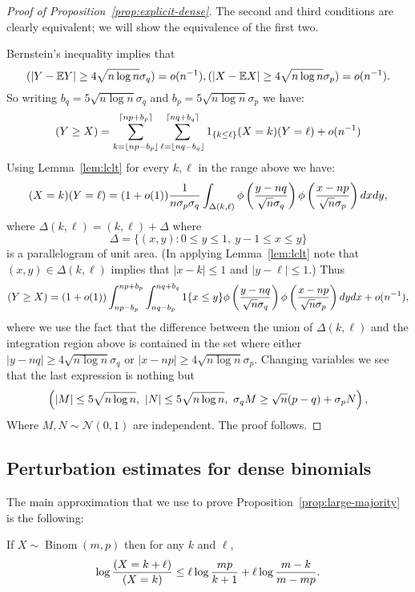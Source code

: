 \documentclass[EJP]{ejpecp}
\newcommand{\E}{\mathbb{E}}
\newcommand{\1}[1]{\mathbbm{1}_{\{#1\}}}
\newcommand{\normal}{\mathcal{N}}
\let\Pr\relax
\DeclareMathOperator{\Pr}{Pr}
\DeclareMathOperator{\Binom}{Binom}
\begin{document}
\begin{proof}[Proof of Proposition~\ref{prop:explicit-dense}]
The second and third conditions are clearly equivalent; we will show
the equivalence of the first two.

Bernstein's inequality implies that
\[
\Pr(|Y-\E Y| \geq 4 \sqrt{n \log n} \sigma_q) = o(n^{-1}),
\Pr(|X-\E X| \geq 4 \sqrt{n \log n} \sigma_p) = o(n^{-1}).
\]
So writing $b_q = 5 \sqrt{n \log n} \sigma_q$ and $b_p = 5 \sqrt{n \log n} \sigma_p$ we have:
\[
\Pr(Y \geq X) =
\sum_{k = \lfloor np - b_p \rfloor}^{\lceil np + b_p \rceil} \sum_{\ell = \lfloor nq - b_q\rfloor}^{\lceil nq + b_q \rceil} 1_{\{k \leq \ell\}}
\Pr(X = k) \Pr(Y = \ell) +o(n^{-1})
\]
Using Lemma~\ref{lem:lclt} for every $k,\ell$ in the range above we have:
\[
\Pr(X = k) \Pr(Y = \ell) = (1+o(1)) \frac{1}{n \sigma_p \sigma_q}
\int_{\Delta(k,\ell)} \phi \left( \frac{y-nq}{\sqrt{n} \sigma_q} \right)
\phi \left( \frac{x-np}{\sqrt{n} \sigma_p} \right) dx dy,
\]
where $\Delta(k,\ell) = (k,\ell) + \Delta$ where
\[
\Delta = \{ (x,y) : 0 \leq y \leq 1, \ y-1 \le x \le y \}
\]
is a parallelogram of unit area. (In applying Lemma~\ref{lem:lclt}
  note that $(x, y) \in \Delta(k, \ell)$ implies that
$|x - k| \le 1$ and $|y - \ell| \le 1$.)
Thus
\[
\Pr(Y \geq X) =
(1+o(1)) \int_{np - b_p}^{np + b_p} \int_{nq - b_p}^{nq + b_q}
1{\{x \le y\}}
\phi \left( \frac{y-nq}{\sqrt{n} \sigma_q} \right)
\phi \left( \frac{x-np}{\sqrt{n} \sigma_p} \right) dy dx + o(n^{-1}),
\]
where we use the fact that the difference between the union of $\Delta(k,\ell)$ and
the integration region above is contained in the set where either
$|y-nq| \geq 4 \sqrt{n \log n} \sigma_q$ or $|x-np| \geq 4 \sqrt{n \log n} \sigma_p$.
Changing variables we see that the last expression is nothing but
\[
\Pr\left( |M| \leq 5 \sqrt{n \log n}, \ |N| \leq 5 \sqrt{n \log n}, \ 
\sigma_q M \geq \sqrt{n}(p-q) + \sigma_p N\right),
\]
Where $M,N \sim \normal(0,1)$ are independent. The proof follows.
\end{proof}

\subsection{Perturbation estimates for dense binomials}

The main approximation that we use to prove
Proposition~\ref{prop:large-majority} is the following:
\begin{lemma}\label{lem:ratio}
  If $X \sim \Binom(m, p)$ then for any $k$ and $\ell$,
 \[
  \log \frac{\Pr(X = k + \ell)}{\Pr(X = k)} \le
  \ell \log \frac{mp}{k+1} + \ell \log \frac{m-k}{m-mp}.
 \]
\end{lemma}
\end{document}
